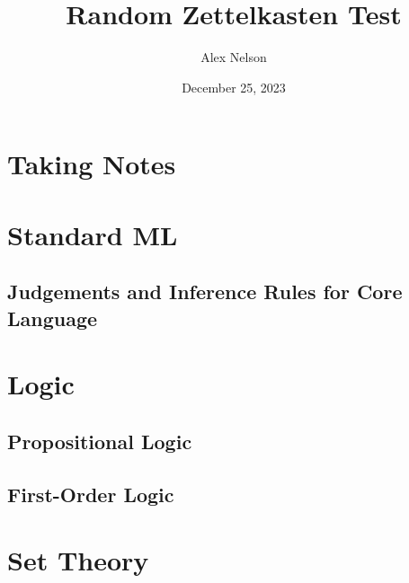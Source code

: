 \documentclass[dvipsnames,HTML]{amsbook}%
\title{Random Zettelkasten Test}
\author{Alex Nelson}
\date{December 25, 2023}
\begin{document}
\frontmatter
\maketitle
\tableofcontents
\mainmatter
\vfill\eject
\chapter{Taking Notes}


\chapter{Standard ML}

\section{Judgements and Inference Rules for Core Language}


\chapter{Logic}
\section{Propositional Logic}

\section{First-Order Logic}


\chapter{Set Theory}



\backmatter
\nocite{*}

\end{document}
